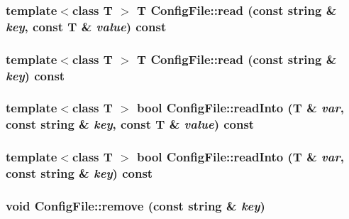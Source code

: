 \label{classConfigFile_afd3d1146ae212a7e5802961f5ad3fe91}
\hypertarget{classConfigFile_a58fe3e41915e8f119a91d51d5d369014}{
\subsubsection[{read}]{\setlength{\rightskip}{0pt plus 5cm}template$<$class T $>$ T ConfigFile::read (const string \& {\em key}, \/  const T \& {\em value}) const}}
\label{classConfigFile_a58fe3e41915e8f119a91d51d5d369014}
\hypertarget{classConfigFile_a2c870b7009aa29208838fc73f8dde6af}{
\subsubsection[{read}]{\setlength{\rightskip}{0pt plus 5cm}template$<$class T $>$ T ConfigFile::read (const string \& {\em key}) const}}
\label{classConfigFile_a2c870b7009aa29208838fc73f8dde6af}
\hypertarget{classConfigFile_a22b3d7f8312ca371631d75d803263f10}{
\subsubsection[{readInto}]{\setlength{\rightskip}{0pt plus 5cm}template$<$class T $>$ bool ConfigFile::readInto (T \& {\em var}, \/  const string \& {\em key}, \/  const T \& {\em value}) const}}
\label{classConfigFile_a22b3d7f8312ca371631d75d803263f10}
\hypertarget{classConfigFile_a7526e5aad42677251502b67c579d1539}{
\subsubsection[{readInto}]{\setlength{\rightskip}{0pt plus 5cm}template$<$class T $>$ bool ConfigFile::readInto (T \& {\em var}, \/  const string \& {\em key}) const}}
\label{classConfigFile_a7526e5aad42677251502b67c579d1539}
\hypertarget{classConfigFile_afca295f72101b138ad2702a11c342f37}{
\subsubsection[{remove}]{\setlength{\rightskip}{0pt plus 5cm}void ConfigFile::remove (const string \& {\em key})}}
